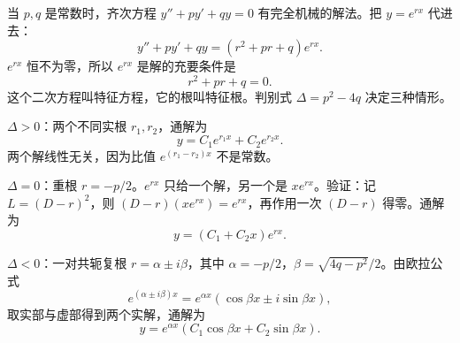当 $p,q$ 是常数时，齐次方程 $y''+py'+qy=0$ 有完全机械的解法。把 $y=e^{rx}$ 代进去：
\[
  y''+py'+qy=(r^2+pr+q)e^{rx}.
\]
$e^{rx}$ 恒不为零，所以 $e^{rx}$ 是解的充要条件是
\[
  r^2+pr+q=0.
\]
这个二次方程叫特征方程，它的根叫特征根。判别式 $\Delta=p^2-4q$ 决定三种情形。

$\Delta>0$：两个不同实根 $r_1,r_2$，通解为
\[
  y=C_1e^{r_1x}+C_2e^{r_2x}.
\]
两个解线性无关，因为比值 $e^{(r_1-r_2)x}$ 不是常数。

$\Delta=0$：重根 $r=-p/2$。$e^{rx}$ 只给一个解，另一个是 $xe^{rx}$。验证：记 $L=(D-r)^2$，则 $(D-r)(xe^{rx})=e^{rx}$，再作用一次 $(D-r)$ 得零。通解为
\[
  y=(C_1+C_2x)e^{rx}.
\]

$\Delta<0$：一对共轭复根 $r=\alpha\pm i\beta$，其中 $\alpha=-p/2$，$\beta=\sqrt{4q-p^2}/2$。由欧拉公式
\[
  e^{(\alpha\pm i\beta)x}=e^{\alpha x}(\cos\beta x\pm i\sin\beta x),
\]
取实部与虚部得到两个实解，通解为
\[
  y=e^{\alpha x}(C_1\cos\beta x+C_2\sin\beta x).
\]

